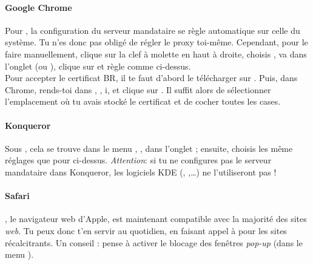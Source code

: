 


\paragraph{Google Chrome}

Pour , la configuration du serveur mandataire se r\`egle automatique sur celle du système. Tu n'es donc pas obligé de régler le proxy toi-même. Cependant, pour le faire manuellement, clique sur la
clef à molette en haut à droite, choisis , va dans l'onglet  (ou ), clique sur  et règle comme ci-dessus.\\

Pour accepter le certificat BR, il te faut d'abord le t\'el\'echarger sur . Puis, dans Chrome, rends-toi dans , , i,  et clique sur . Il suffit alors de s\'electionner l'emplacement o\`u tu avais stock\'e le certificat et de cocher toutes les cases.

\paragraph{Konqueror}

Sous , cela se trouve dans le menu , ,
dans l'onglet  ; ensuite, choisis les même réglages que pour  ci-dessus. \emph{Attention}: si tu ne configures pas le serveur mandataire dans Konqueror,
les logiciels KDE (, ,\dots) ne l'utiliseront pas !

\paragraph{Safari}

, le navigateur web d'Apple, est maintenant compatible avec la majorit\'e des sites \emph{web}. Tu peux donc t'en servir au quotidien,
en faisant appel \`a   pour les sites r\'ecalcitrants. Un conseil : pense \`a  activer le blocage des fen\^etres \emph{pop-up} (dans le menu ). \\


